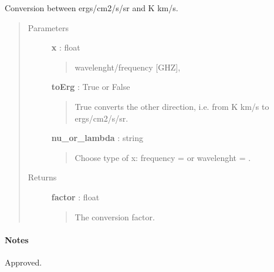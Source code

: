 \documentclass[a4paper,10pt,english]{sphinxmanual}
\begin{document}
\begin{fulllineitems}
\label{functions:astrolyze.functions.units.ergToKkms}
Conversion between ergs/cm2/s/sr and K km/s.
\begin{quote}\begin{description}
\item[{Parameters }] \leavevmode
\textbf{x} : float
\begin{quote}

wavelenght/frequency {[}GHZ{]},
\end{quote}

\textbf{toErg} : True or False
\begin{quote}

True converts the other direction, i.e. from K km/s to ergs/cm2/s/sr.
\end{quote}

\textbf{nu\_or\_lambda} : string
\begin{quote}

Choose type of x: frequency =  or wavelenght = .
\end{quote}

\item[{Returns }] \leavevmode
\textbf{factor} : float
\begin{quote}

The conversion factor.
\end{quote}

\end{description}\end{quote}
\paragraph{Notes}

Approved.

\end{fulllineitems}

\end{document}
